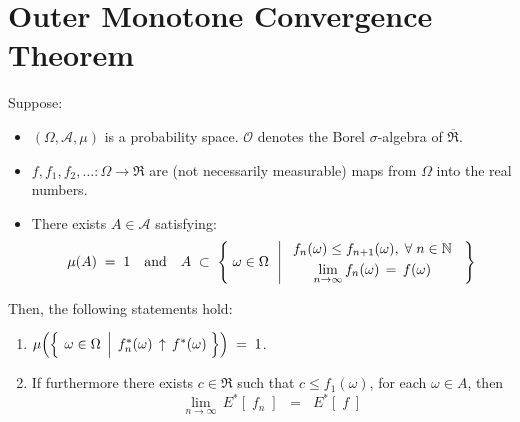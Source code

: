 

\section{Outer Monotone Convergence Theorem}
\setcounter{theorem}{0}
\setcounter{equation}{0}


\renewcommand{\theenumi}{\roman{enumi}}
\renewcommand{\labelenumi}{\textnormal{(\theenumi)}$\;\;$}


\begin{theorem}
\mbox{}\vskip 0.1cm
\noindent
Suppose:
\begin{itemize}
\item
	$(\Omega,\mathcal{A},\mu)$ is a probability space.
	$\mathcal{O}$ denotes the Borel $\sigma$-algebra of $\overline{\Re}$.
\item
	$f, f_{1}, f_{2}, \ldots : \Omega \longrightarrow \Re$ are (not necessarily measurable)
	maps from $\Omega$ into the real numbers.
\item
	There exists $A \in \mathcal{A}$
	satisfying:
	\begin{equation*}
	\mu(A) \;=\; 1
	\quad\textnormal{and}\quad
	A \;\subset\;\left\{\;
		\omega \overset{{\color{white}.}}{\in} \Omega
		\,\;\left\vert\;
		\begin{array}{c}
			f_{n}(\omega) \leq f_{n+1}(\omega),\;\forall\;n\in\N
			\\
			\underset{n\rightarrow\infty}{\lim}\,f_{n}(\omega) \,\overset{{\color{white}+}}{=}\, f(\omega)
		\end{array}
		\right.
		\;\right\}
	\end{equation*}
\end{itemize}
Then, the following statements hold:
\begin{enumerate}
\item
	$\mu\!\left(\left\{\;
			\left.
			\omega \overset{{\color{white}.}}{\in} \Omega
			\,\;\right\vert\;
			f^{*}_{n}(\omega) \,\uparrow\, f^{*}(\omega)
			\;\right\}\right)
	\; = \; 1$.
\item
	If furthermore there exists $c \in \Re$ such that $c \leq f_{1}(\omega)$, for each $\omega \in A$, then
	\begin{equation*}
	\underset{n\rightarrow\infty}{\lim}\,E^{*}\!\left[\;f_{n}\;\right]
	\;\; = \;\; E^{*}\!\left[\;f\;\right]
	\end{equation*}
\end{enumerate}
\end{theorem}
